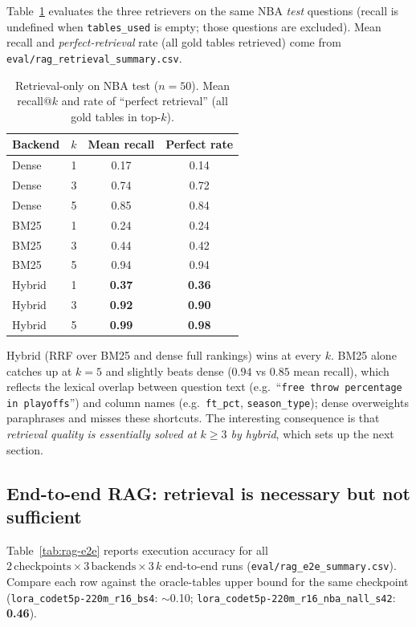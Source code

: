 \documentclass[11pt,a4paper]{article}
\newcommand{\bestckpt}{\texttt{lora\_codet5p-220m\_r16\_nba\_nall\_s42}}
\newcommand{\spiderckpt}{\texttt{lora\_codet5p-220m\_r16\_bs4}}
\begin{document}
Table~\ref{tab:retrieval} evaluates the three retrievers on the same NBA
\emph{test} questions (recall is undefined when \texttt{tables\_used} is
empty; those questions are excluded). Mean recall and \emph{perfect-retrieval}
rate (all gold tables retrieved) come from
\texttt{eval/rag\_retrieval\_summary.csv}.

\begin{table}[h]
\centering
\caption{Retrieval-only on NBA test ($n=50$). Mean recall@$k$ and rate of
``perfect retrieval'' (all gold tables in top-$k$).}
\label{tab:retrieval}
\small
\begin{tabular}{l r c c}
\toprule
Backend & $k$ & Mean recall & Perfect rate \\
\midrule
Dense   & 1 & 0.17 & 0.14 \\
Dense   & 3 & 0.74 & 0.72 \\
Dense   & 5 & 0.85 & 0.84 \\
\midrule
BM25    & 1 & 0.24 & 0.24 \\
BM25    & 3 & 0.44 & 0.42 \\
BM25    & 5 & 0.94 & 0.94 \\
\midrule
Hybrid  & 1 & \textbf{0.37} & \textbf{0.36} \\
Hybrid  & 3 & \textbf{0.92} & \textbf{0.90} \\
Hybrid  & 5 & \textbf{0.99} & \textbf{0.98} \\
\bottomrule
\end{tabular}
\end{table}

Hybrid (RRF over BM25 and dense full rankings) wins at every $k$. BM25 alone
catches up at $k=5$ and slightly beats dense ($0.94$ vs $0.85$ mean recall),
which reflects the lexical overlap between question text (e.g.\
``\texttt{free throw percentage in playoffs}'') and column names (e.g.\
\texttt{ft\_pct}, \texttt{season\_type}); dense overweights paraphrases and
misses these shortcuts. The interesting consequence is that \emph{retrieval
quality is essentially solved at $k\geq 3$ by hybrid}, which sets up the
next section.

\subsection{End-to-end RAG: retrieval is necessary but not sufficient}
\label{sec:rag-e2e}

Table~\ref{tab:rag-e2e} reports execution accuracy for all
$2\,\text{checkpoints}\times 3\,\text{backends}\times 3\,k$ end-to-end runs
(\texttt{eval/rag\_e2e\_summary.csv}). Compare each row against the
oracle-tables upper bound for the same checkpoint
(\spiderckpt{}: $\sim$0.10; \bestckpt{}: \textbf{0.46}).
\end{document}
